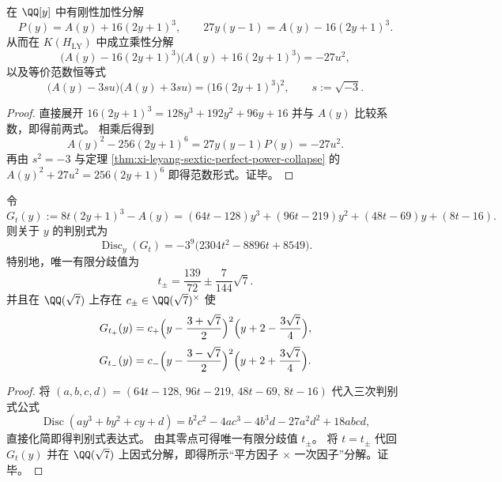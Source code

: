 \begin{conclusion}\label{con:xi-leyang-cubic-quadratic-dual-decomposition}
在 \(\QQ[y]\) 中有刚性加性分解
\[
P(y)=A(y)+16(2y+1)^3,\qquad
27y(y-1)=A(y)-16(2y+1)^3.
\]
从而在 \(K(H_{\mathrm{LY}})\) 中成立乘性分解
\[
\bigl(A(y)-16(2y+1)^3\bigr)\bigl(A(y)+16(2y+1)^3\bigr)=-27u^2,
\]
以及等价范数恒等式
\[
\bigl(A(y)-3su\bigr)\bigl(A(y)+3su\bigr)=\bigl(16(2y+1)^3\bigr)^2,
\qquad s:=\sqrt{-3}.
\]
\end{conclusion}
\begin{proof}
直接展开
\(
16(2y+1)^3=128y^3+192y^2+96y+16
\)
并与 \(A(y)\) 比较系数，即得前两式。
相乘后得到
\[
A(y)^2-256(2y+1)^6=27y(y-1)P(y)=-27u^2.
\]
再由 \(s^2=-3\) 与定理 \ref{thm:xi-leyang-sextic-perfect-power-collapse} 的
\(
A(y)^2+27u^2=256(2y+1)^6
\)
即得范数形式。证毕。
\end{proof}

\begin{theorem}\label{thm:xi-leyang-gt-discriminant-and-special-fiber-factorization}
令
\[
G_t(y):=8t(2y+1)^3-A(y)
=(64t-128)y^3+(96t-219)y^2+(48t-69)y+(8t-16).
\]
则关于 \(y\) 的判别式为
\[
\operatorname{Disc}_y(G_t)=-3^9\bigl(2304t^2-8896t+8549\bigr).
\]
特别地，唯一有限分歧值为
\[
t_\pm=\frac{139}{72}\pm\frac{7}{144}\sqrt7.
\]
并且在 \(\QQ(\sqrt7)\) 上存在 \(c_\pm\in\QQ(\sqrt7)^\times\) 使
\[
G_{t_+}(y)=c_+\Bigl(y-\frac{3+\sqrt7}{2}\Bigr)^2\Bigl(y+2-\frac{3\sqrt7}{4}\Bigr),
\]
\[
G_{t_-}(y)=c_-\Bigl(y-\frac{3-\sqrt7}{2}\Bigr)^2\Bigl(y+2+\frac{3\sqrt7}{4}\Bigr).
\]
\end{theorem}
\begin{proof}
将
\(
(a,b,c,d)=(64t-128,\,96t-219,\,48t-69,\,8t-16)
\)
代入三次判别式公式
\[
\operatorname{Disc}(ay^3+by^2+cy+d)
=b^2c^2-4ac^3-4b^3d-27a^2d^2+18abcd,
\]
直接化简即得判别式表达式。
由其零点可得唯一有限分歧值 \(t_\pm\)。
将 \(t=t_\pm\) 代回 \(G_t(y)\) 并在 \(\QQ(\sqrt7)\) 上因式分解，即得所示“平方因子 \(\times\) 一次因子”分解。证毕。
\end{proof}

